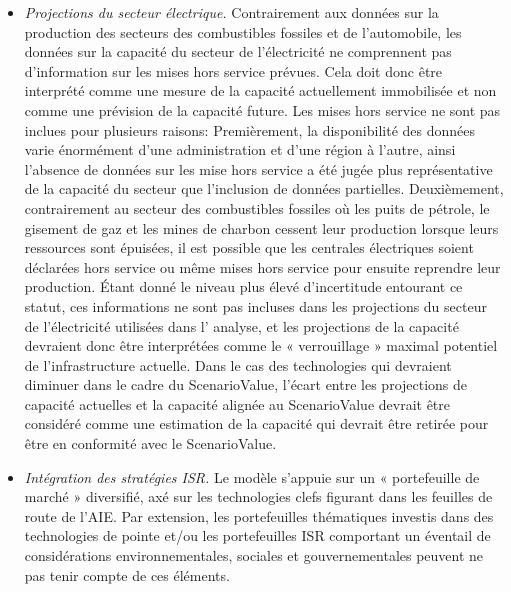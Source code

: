 \documentclass[10pt,table,a4]{article}\usepackage[]{graphicx}\usepackage[]{color}
\begin{document}
\begin{multicols}{2}
{\begin{itemize}
			\item{\textit{Projections du secteur électrique.} Contrairement aux données sur la production des secteurs des combustibles fossiles et de l'automobile, les données sur la capacité du secteur de l'électricité ne comprennent pas d'information sur les mises hors service prévues. Cela doit donc être interprété comme une mesure de la capacité actuellement immobilisée et non comme une prévision de la capacité future. Les mises hors service ne sont pas inclues pour plusieurs raisons: Premièrement, la disponibilité des données varie énormément d'une administration et d'une région à l'autre, ainsi l'absence de données sur les mise hors service a été jugée plus représentative de la capacité du secteur que l'inclusion de données partielles.
				Deuxièmement, contrairement au secteur des combustibles fossiles où les puits de pétrole, le gisement de gaz et les mines de charbon cessent leur production lorsque leurs ressources sont épuisées, il est possible que les centrales électriques soient déclarées hors service ou même mises hors service pour ensuite reprendre leur production. Étant donné le niveau plus élevé d'incertitude entourant ce statut, ces informations ne sont pas incluses dans les projections du secteur de l'électricité utilisées dans l' analyse, et les projections de la capacité devraient donc être interprétées comme le « verrouillage » maximal potentiel de l'infrastructure actuelle. Dans le cas des technologies qui devraient diminuer dans le cadre du ScenarioValue, l'écart entre les projections de capacité actuelles et la capacité alignée au ScenarioValue devrait être considéré comme une estimation de la capacité qui devrait être retirée pour être en conformité avec le ScenarioValue.}
			
			\item{\textit{Intégration des stratégies ISR.} Le modèle s'appuie sur un « portefeuille de marché » diversifié, axé sur les technologies clefs figurant dans les feuilles de route de l'AIE. Par extension, les portefeuilles thématiques investis dans des technologies de pointe et/ou les portefeuilles ISR comportant un éventail de considérations environnementales, sociales et gouvernementales peuvent ne pas tenir compte de ces éléments.}
			
			
		\end{itemize}
	}
	\end{multicols}
	\newpage		
	
\end{document}
